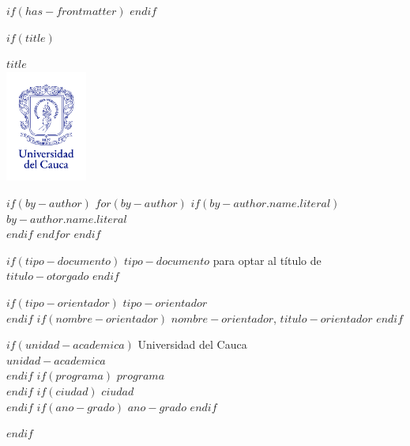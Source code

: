 $if(has-frontmatter)$
\frontmatter
$endif$

$if(title)$
\cleardoublepage
\thispagestyle{empty}

{\centering
{\bfseries $title$}\\[2cm]
\includegraphics[width=0.2\textwidth]{assets/unicauca_vertical.png}
\vspace{1cm}

\vspace{1cm}
$if(by-author)$
$for(by-author)$
$if(by-author.name.literal)$
{$by-author.name.literal$}\\
$endif$
$endfor$
$endif$
\vspace{1cm}

$if(tipo-documento)$
{$tipo-documento$ para optar al título de $titulo-otorgado$}
$endif$
\vspace{1cm}

$if(tipo-orientador)$
{$tipo-orientador$}\\
$endif$
$if(nombre-orientador)$
{$nombre-orientador$, $titulo-orientador$}
$endif$
\vspace{1cm}

$if(unidad-academica)$
{Universidad del Cauca}\\
{$unidad-academica$}\\
$endif$
$if(programa)$
{$programa$}\\
$endif$
$if(ciudad)$
{$ciudad$}\\
$endif$
$if(ano-grado)$
{$ano-grado$}
$endif$
}
$endif$
\newpage

